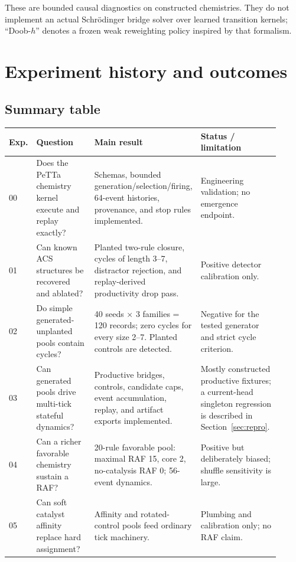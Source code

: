 \documentclass[11pt]{article}
\begin{document}
These are bounded causal diagnostics on constructed chemistries.  They do not
implement an actual Schr\"odinger bridge solver over learned transition
kernels; ``Doob-$h$'' denotes a frozen weak reweighting policy inspired by that
formalism.

\section{Experiment history and outcomes}

\subsection{Summary table}

\small
\begin{longtable}{p{0.08\linewidth}p{0.24\linewidth}p{0.29\linewidth}p{0.30\linewidth}}
\toprule
Exp. & Question & Main result & Status / limitation \\
\midrule
\endhead
00 & Does the PeTTa chemistry kernel execute and replay exactly? &
Schemas, bounded generation/selection/firing, 64-event histories, provenance,
and stop rules implemented. & Engineering validation; no emergence endpoint. \\
01 & Can known ACS structures be recovered and ablated? &
Planted two-rule closure, cycles of length 3--7, distractor rejection, and
replay-derived productivity drop pass. & Positive detector calibration only. \\
02 & Do simple generated-unplanted pools contain cycles? &
40 seeds $\times$ 3 families = 120 records; zero cycles for every size 2--7.
Planted controls are detected. & Negative for the tested generator and strict
cycle criterion. \\
03 & Can generated pools drive multi-tick stateful dynamics? &
Productive bridges, controls, candidate caps, event accumulation, replay, and
artifact exports implemented. & Mostly constructed productive fixtures; a
current-head singleton regression is described in Section~\ref{sec:repro}. \\
04 & Can a richer favorable chemistry sustain a RAF? &
20-rule favorable pool: maximal RAF 15, core 2, no-catalysis RAF 0; 56-event
dynamics. & Positive but deliberately biased; shuffle sensitivity is large. \\
05 & Can soft catalyst affinity replace hard assignment? &
Affinity and rotated-control pools feed ordinary tick machinery. & Plumbing
and calibration only; no RAF claim. \\

\end{longtable}
\end{document}
